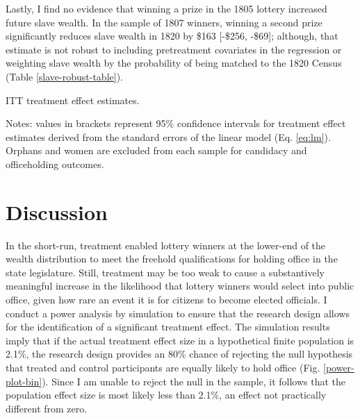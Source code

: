 Lastly, I find no evidence that winning a prize in the 1805 lottery increased future slave wealth. In the sample of 1807 winners, winning a second prize significantly reduces slave wealth in 1820 by \$163 [-\$256, -\$69]; although, that estimate is not robust to including pretreatment covariates in the regression or weighting slave wealth by the probability of being matched to the 1820 Census (Table \ref{slave-robust-table}).

\begin{table}[htbp] 
	\begin{center}
		\caption{ITT treatment effect estimates.\label{itt-table}}   
		\resizebox{0.9\width}{!}{}
	\end{center}
	\footnotesize{Notes: values in brackets represent 95\% confidence intervals for treatment effect estimates derived from the standard errors of the linear model (Eq. \ref{eq:lm}). Orphans and women are excluded from each sample for candidacy and officeholding outcomes.}
\end{table}

\section{Discussion} \label{discussion-ch2}

In the short-run, treatment enabled lottery winners at the lower-end of the wealth distribution to meet the freehold qualifications for holding office in the state legislature. Still, treatment may be too weak to cause a substantively meaningful increase in the likelihood that lottery winners would select into public office, given how rare an event it is for citizens to become elected officials. I conduct a power analysis by simulation to ensure that the research design allows for the identification of a significant treatment effect. The simulation results imply that if the actual treatment effect size in a hypothetical finite population is 2.1\%, the research design provides an 80\% chance of rejecting the null hypothesis that treated and control participants are equally likely to hold office (Fig. \ref{power-plot-bin}). Since I am unable to reject the null in the sample, it follows that the population effect size is most likely less than 2.1\%, an effect not practically different from zero. 

